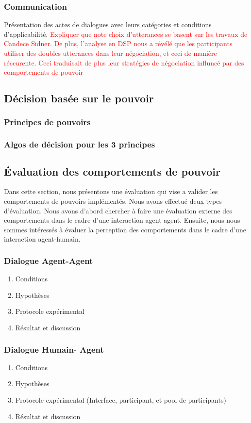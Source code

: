 \subsubsection{Communication}
Présentation des actes de dialogues avec leurs catégories et conditions d'applicabilité. 
\textcolor{red}{Expliquer que note choix d'utterances se basent sur les travaux de Candece Sidner. De plus, l'analyse en DSP nous a révélé que les participants utiliser des doubles utterances dans leur négociation, et ceci de manière réccurente. Ceci traduisait de plus leur stratégies de négociation influncé par des comportements de pouvoir}

\subsection{Décision basée sur le pouvoir}
\subsubsection{Principes de pouvoirs }

\subsubsection{Algos de décision pour les 3 principes}

\subsection{Évaluation des comportements de pouvoir}
Dans cette section, nous présentons une évaluation qui vise a valider les comportements de pouvoirs implémentés. Nous avons effectué deux types d'évaluation. Nous avons d'abord chercher à faire une évaluation externe des comportements dans le cadre d'une interaction agent-agent.  Ensuite, nous nous sommes intéressés à évaluer la perception des comportements dans le cadre d'une interaction agent-humain. 

\subsubsection{Dialogue Agent-Agent}
\begin{enumerate}
	\item Conditions
	\item Hypothèses
	\item Protocole expérimental
	\item Résultat et discussion 
\end{enumerate}
\subsubsection{Dialogue Humain- Agent}
\begin{enumerate}
	\item Conditions
	\item Hypothèses
	\item Protocole expérimental (Interface, participant, et pool de participants)
	\item Résultat et discussion 
\end{enumerate}

